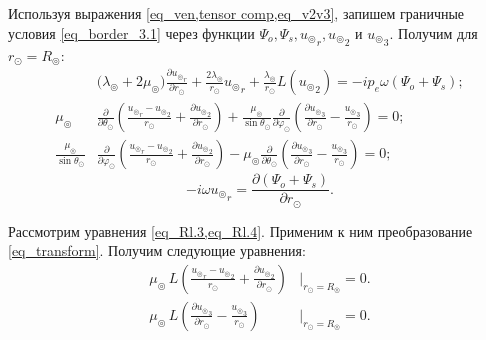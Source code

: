 Используя выражения \cref{eq_ven,tensor comp,eq_v2v3}, запишем граничные условия \cref{eq_border_3.1} через функции $\Psi_o, \Psi_s, {u_\circledcirc}_r, {u_\circledcirc}_2$ и ${u_\circledcirc}_3.$ Получим для $r_\odot = R_\circledcirc:$
\begin{align}
&\biggl(\lambda_\circledcirc+2\mu_\circledcirc\biggr)\frac{\partial {u_\circledcirc}_r}{\partial r_\odot} + \frac{2\lambda_\circledcirc}{r_\odot}{u_\circledcirc}_r + \frac{\lambda_\circledcirc}{r_\odot}L({u_\circledcirc}_2) = -ip_e\omega\left(\Psi_o+\Psi_s\right);\label{eq_Rl.2}\\
\mu_\circledcirc&\frac{\partial}{\partial \theta_\odot}\left(\frac{{u_\circledcirc}_r-{u_\circledcirc}_2}{r_\odot} + \frac{\partial {u_\circledcirc}_2}{\partial r_\odot}\right) + \frac{\mu_\circledcirc}{\sin\theta_\odot}\frac{\partial}{\partial \varphi_\odot}\left(\frac{\partial {u_\circledcirc}_3}{\partial r_\odot} - \frac{{u_\circledcirc}_3}{r_\odot}\right) = 0;\label{eq_Rl.3}\\
\frac{\mu_\circledcirc}{\sin\theta_\odot}&\frac{\partial}{\partial \varphi_\odot}\left(\frac{{u_\circledcirc}_r-{u_\circledcirc}_2}{r_\odot} + \frac{\partial {u_\circledcirc}_2}{\partial r_\odot}\right) - \mu_\circledcirc\frac{\partial}{\partial \theta_\odot}\left(\frac{\partial {u_\circledcirc}_3}{\partial r_\odot} - \frac{{u_\circledcirc}_3}{r_\odot}\right) = 0;\label{eq_Rl.4}
\end{align}
\begin{equation}\label{eq_Rl.1}
-i\omega{u_\circledcirc}_r = \frac{\partial(\Psi_o+\Psi_s)}{\partial r_\odot} .
\end{equation}


Рассмотрим уравнения \cref{eq_Rl.3,eq_Rl.4}. Применим к ним преобразование \cref{eq_transform}. Получим следующие уравнения:
\begin{align}
\mu_\circledcirc \,L\!\left(\frac{{u_\circledcirc}_r-{u_\circledcirc}_2}{r_\odot} + \frac{\partial {u_\circledcirc}_2}{\partial r_\odot}\right)&\Biggr|_{r_\odot = R_\circledcirc} = 0.\label{eq_Rl.3a}\\
\mu_\circledcirc \,L\!\left(\frac{\partial {u_\circledcirc}_3}{\partial r_\odot} - \frac{{u_\circledcirc}_3}{r_\odot}\right)&\Biggr|_{r_\odot = R_\circledcirc} = 0.\label{eq_Rl.4a}
\end{align}



